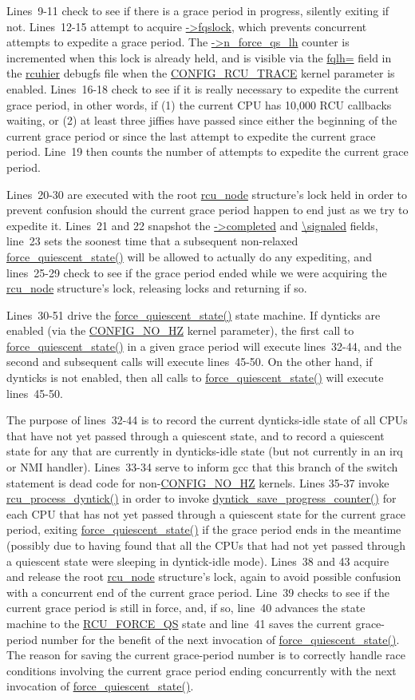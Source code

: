Lines~9-11 check to see if there is a grace period in progress,
silently exiting if not.
Lines~12-15 attempt to acquire \url{->fqslock}, which prevents concurrent
attempts to expedite a grace period.
The \url{->n_force_qs_lh} counter is incremented when this lock is
already held, and is visible via the \url{fqlh=} field
in the \url{rcuhier} debugfs file when the \url{CONFIG_RCU_TRACE} kernel
parameter is enabled.
Lines~16-18 check to see if it is really necessary to expedite the
current grace period, in other words, if (1) the current CPU has 10,000
RCU callbacks waiting, or (2) at least three jiffies have passed
since either the beginning of the current grace period or since the
last attempt to expedite the current grace period.
Line~19 then counts the number of attempts to expedite the current
grace period.

Lines~20-30 are executed with the root \url{rcu_node} structure's lock
held in order to prevent confusion should the current grace period
happen to end just as we try to expedite it.
Lines~21 and 22 snapshot the \url{->completed} and \url{\signaled} fields,
line~23 sets the soonest time that a subsequent non-relaxed
\url{force_quiescent_state()} will be allowed to actually do
any expediting, and lines~25-29 check to see if the grace period
ended while we were acquiring the \url{rcu_node} structure's lock,
releasing locks and returning if so.

Lines~30-51 drive the \url{force_quiescent_state()} state machine.
If dynticks are enabled (via the \url{CONFIG_NO_HZ} kernel
parameter), the first call
to \url{force_quiescent_state()} in a given grace period will
execute lines~32-44, and the second and subsequent calls will
execute lines~45-50.
On the other hand, if dynticks is not enabled, then all calls to
\url{force_quiescent_state()} will execute lines~45-50.

The purpose of lines~32-44 is to record the current dynticks-idle state
of all CPUs that have not yet passed through a quiescent state, and
to record a quiescent state for any that are currently in dynticks-idle
state (but not currently in an irq or NMI handler).
Lines~33-34 serve to inform gcc that this branch of the switch statement
is dead code for non-\url{CONFIG_NO_HZ} kernels.
Lines 35-37 invoke \url{rcu_process_dyntick()} in order to invoke
\url{dyntick_save_progress_counter()} for each CPU that has not yet
passed through a quiescent state for the current grace period,
exiting \url{force_quiescent_state()} if the grace period ends in
the meantime (possibly due to having found that all the CPUs that
had not yet passed through a quiescent state were sleeping in
dyntick-idle mode).
Lines~38 and 43 acquire and release the root \url{rcu_node} structure's
lock, again to avoid possible confusion with a concurrent end of the
current grace period.
Line~39 checks to see if the current grace period is still in force, and,
if so, line~40 advances the state machine to the \url{RCU_FORCE_QS} state
and line~41 saves the current grace-period number for the benefit of
the next invocation of \url{force_quiescent_state()}.
The reason for saving the current grace-period number is to correctly
handle race conditions involving the current grace period ending
concurrently with the next invocation of \url{force_quiescent_state()}.

